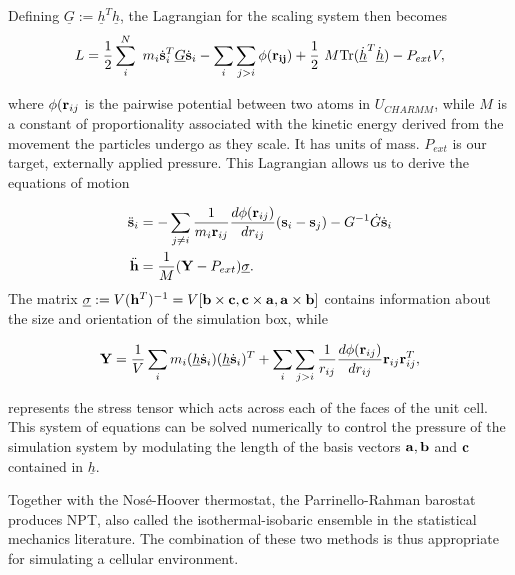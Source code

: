 Defining $\underline{G} := \underline{h}^T\underline{h}$, the Lagrangian for the scaling system then becomes
\begin{equation}
\begin{aligned}
	L = \frac{1}{2} \sum_i^N \  m_i \dot{\bold{s}}_i^T\underline{G}\dot{\bold{s}}_i - \sum_i \sum_{j > i } \phi (\bold{r_{ij}}) + \frac{1}{2} \ M \text{Tr}(\dot{\underline{h}}^T\dot{\underline{h}})   - {P}_{ext} V,
\end{aligned}
\end{equation}

where $\phi(\bold{r}_{ij}$ is the pairwise potential between two atoms in $U_{CHARMM}$, while $M$ is a constant of proportionality associated with the kinetic energy derived from the movement the particles undergo as they scale. It has units of mass. $P_{ext}$ is our target, externally applied pressure. This Lagrangian allows us to derive the equations of motion  

\begin{equation}
\begin{aligned}
	\ddot{\bold{s}}_i &= -\sum_{j\neq i}   \frac{1}{m_i\bold{r}_{ij} }\frac{d\phi(\bold{r}_{ij})}{d r_{ij}}  (\bold{s}_i - \bold{s}_j) - G^{-1}\dot{G} \dot{\bold{s}}_i \\
	\ddot{\bold{h}} &= \frac{1}{M} (\bold{Y} -P_{ext}) \underline{\sigma}.
\end{aligned}
\end{equation}
The matrix $\underline{\sigma} := V (\bold{h}^T)^{-1} = V  [\bold{b} \times \bold{c}, \bold{c} \times \bold{a}, \bold{a} \times \bold{b}] $  contains information about the size and orientation of the simulation box, while 

\begin{equation}
\begin{aligned}
	\bold{Y} = \frac{1}{V}\sum_i m_i (\underline{h}\dot{\bold{s}}_i) (\underline{h}\dot{\bold{s}}_i)^T + \sum_i \sum_{j>i}\frac{1}{{r}_{ij}} \frac{d \phi (\bold{r}_{ij})}{dr_{ij}} \bold{r}_{ij}\bold{r}_{ij}^T,
\end{aligned}
\end{equation}

represents the stress tensor which acts across each of the faces of the unit cell. 
This system of equations can be solved numerically to control the pressure of the simulation system by modulating the length of the basis vectors $\bold{a}, \bold{b}$ and $\bold{c}$ contained in $\underline{h}$.

	Together with the Nos\'e-Hoover thermostat, the Parrinello-Rahman barostat produces NPT, also called the isothermal-isobaric ensemble in the statistical mechanics literature. The combination of these two methods is thus appropriate for simulating a cellular environment. 


